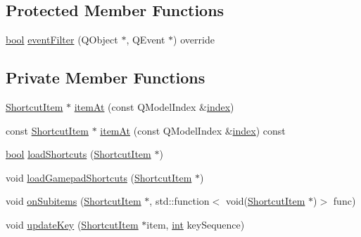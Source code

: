 \subsection*{Protected Member Functions}
\begin{DoxyCompactItemize}
\item 
\mbox{\hyperlink{libretro_8h_a4a26dcae73fb7e1528214a068aca317e}{bool}} \mbox{\hyperlink{class_q_g_b_a_1_1_shortcut_controller_a2a9be67f97609055135ea70bfa2b5c20}{event\+Filter}} (Q\+Object $\ast$, Q\+Event $\ast$) override
\end{DoxyCompactItemize}
\subsection*{Private Member Functions}
\begin{DoxyCompactItemize}
\item 
\mbox{\hyperlink{class_q_g_b_a_1_1_shortcut_controller_1_1_shortcut_item}{Shortcut\+Item}} $\ast$ \mbox{\hyperlink{class_q_g_b_a_1_1_shortcut_controller_a1920d0e239df0d95d87b95b2d286404c}{item\+At}} (const Q\+Model\+Index \&\mbox{\hyperlink{class_q_g_b_a_1_1_shortcut_controller_ae75cb760bb05d9e1e20b8f1080884cbd}{index}})
\item 
const \mbox{\hyperlink{class_q_g_b_a_1_1_shortcut_controller_1_1_shortcut_item}{Shortcut\+Item}} $\ast$ \mbox{\hyperlink{class_q_g_b_a_1_1_shortcut_controller_aaa91a06146dda9ceb44d744901ba7b92}{item\+At}} (const Q\+Model\+Index \&\mbox{\hyperlink{class_q_g_b_a_1_1_shortcut_controller_ae75cb760bb05d9e1e20b8f1080884cbd}{index}}) const
\item 
\mbox{\hyperlink{libretro_8h_a4a26dcae73fb7e1528214a068aca317e}{bool}} \mbox{\hyperlink{class_q_g_b_a_1_1_shortcut_controller_a91bd0c455902e715c0133b21a819dd12}{load\+Shortcuts}} (\mbox{\hyperlink{class_q_g_b_a_1_1_shortcut_controller_1_1_shortcut_item}{Shortcut\+Item}} $\ast$)
\item 
void \mbox{\hyperlink{class_q_g_b_a_1_1_shortcut_controller_af130660b45ff1e2f2e676098201f3fa1}{load\+Gamepad\+Shortcuts}} (\mbox{\hyperlink{class_q_g_b_a_1_1_shortcut_controller_1_1_shortcut_item}{Shortcut\+Item}} $\ast$)
\item 
void \mbox{\hyperlink{class_q_g_b_a_1_1_shortcut_controller_a25d9133d4546e69a56135f162badb4c0}{on\+Subitems}} (\mbox{\hyperlink{class_q_g_b_a_1_1_shortcut_controller_1_1_shortcut_item}{Shortcut\+Item}} $\ast$, std\+::function$<$ void(\mbox{\hyperlink{class_q_g_b_a_1_1_shortcut_controller_1_1_shortcut_item}{Shortcut\+Item}} $\ast$)$>$ func)
\item 
void \mbox{\hyperlink{class_q_g_b_a_1_1_shortcut_controller_a1a530e8a7c1c6bc5cab2db9c33a81763}{update\+Key}} (\mbox{\hyperlink{class_q_g_b_a_1_1_shortcut_controller_1_1_shortcut_item}{Shortcut\+Item}} $\ast$item, \mbox{\hyperlink{ioapi_8h_a787fa3cf048117ba7123753c1e74fcd6}{int}} key\+Sequence)
\end{DoxyCompactItemize}
